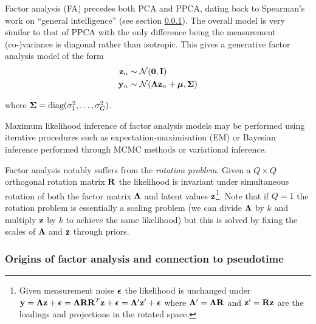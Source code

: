 Factor analysis (FA) precedes both PCA and PPCA, dating back to Spearman's work on ``general intelligence'' \cite{spearman1904general} (see section \ref{intr:fa_hist}). The overall model is very similar to that of PPCA with the only difference being the measurement (co-)variance is diagonal rather than isotropic. This gives a generative factor analysis model of the form
\begin{equation} \label{eq:fa}
  \begin{aligned}
    \mathbf{z}_n & \sim \mathcal{N}(\bm{0}, \mathbf{I}) \\
    \mathbf{y}_n & \sim \mathcal{N}(\bm{\Lambda} \mathbf{z}_n + \bm{\mu}, \bm{\Sigma})
  \end{aligned}
\end{equation}

where $\bm{\Sigma} = \text{diag}(\sigma_1^2, \ldots, \sigma_G^2)$.

Maximum likelihood inference of factor analysis models may be performed using iterative procedures such as expectation-maximisation (EM) or Bayesian inference performed through MCMC methods or variational inference.

Factor analysis notably suffers from the \emph{rotation problem}. Given a $Q \times Q$ orthogonal rotation matrix $\mathbf{R}$ the likelihood is invariant under simultaneous rotation of both the factor matrix $\bm{\Lambda}$ and latent values $\mathbf{z}$\footnote{
Given measurement noise $\bm{\epsilon}$ the likelihood is unchanged under $\mathbf{y} = \bm{\Lambda} \mathbf{z} + \bm{\epsilon} = \bm{\Lambda} \mathbf{R} \mathbf{R}^T \mathbf{z} + \bm{\epsilon} = \bm{\Lambda}' \mathbf{z}' + \bm{\epsilon}$ where $\bm{\Lambda}' = \bm{\Lambda} \mathbf{R}$ and $\mathbf{z}' = \mathbf{R} \mathbf{z}$ are the loadings and projections in the rotated space.
}. %
Note that if $Q=1$ the rotation problem is essentially a scaling problem (we can divide $\bm{\Lambda}$ by $k$ and multiply $\mathbf{z}$ by $k$ to achieve the same likelihood) but this is solved by fixing the scales of $\bm{\Lambda}$ and $\mathbf{z}$ through priors.

\subsubsection{Origins of factor analysis and connection to pseudotime} \label{intr:fa_hist}



